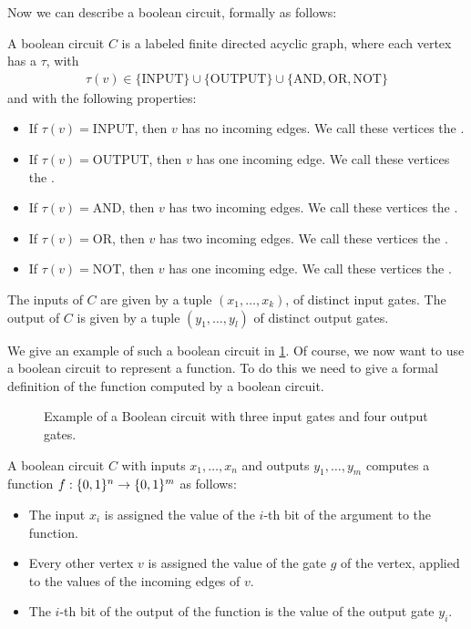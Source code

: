 Now we can describe a boolean circuit, formally as follows:
\begin{definition}
    A boolean circuit $C$ is a labeled finite directed acyclic graph, where each vertex has a  $\tau$, with
    \begin{align*}
        \tau(v) \in \{\text{INPUT}\} \cup \{\text{OUTPUT}\} \cup \{\text{AND}, \text{OR}, \text{NOT}\}
    \end{align*}
    and with the following properties:
    \begin{itemize}
        \item If $\tau(v) = \text{INPUT}$, then $v$ has no incoming edges. We call these vertices the .
        \item If $\tau(v) = \text{OUTPUT}$, then $v$ has one incoming edge. We call these vertices the .
        \item If $\tau(v) = \text{AND}$, then $v$ has two incoming edges. We call these vertices the .
        \item If $\tau(v) = \text{OR}$, then $v$ has two incoming edges. We call these vertices the .
        \item If $\tau(v) = \text{NOT}$, then $v$ has one incoming edge. We call these vertices the .
    \end{itemize}
    The inputs of $C$ are given by a tuple $(x_1, \dots, x_k)$, of distinct input gates. The output of $C$ is given by a tuple $(y_1, \dots, y_l)$ of distinct output gates.
\end{definition}

We give an example of such a boolean circuit in \cref{fig:boolean_circuit_example}. Of course, we now want to use a boolean circuit to represent a function. To do this we need to give a formal definition of the function computed by a boolean circuit.

\begin{figure}
    \centering
    \caption[Example of a Boolean Circuit]{Example of a Boolean circuit with three input gates and four output gates.}
    \label{fig:boolean_circuit_example}
\end{figure}

\begin{definition}
    A boolean circuit $C$ with inputs $x_1, \dots, x_n$ and outputs $y_1, \dots, y_m$ computes a function $f : \{0, 1\}^n \rightarrow \{0, 1\}^m$ as follows:
    \begin{itemize}
        \item The input $x_i$ is assigned the value of the $i$-th bit of the argument to the function.
        \item Every other vertex $v$ is assigned the value of the gate $g$ of the vertex, applied to the values of the incoming edges of $v$.
        \item The $i$-th bit of the output of the function is the value of the output gate $y_i$.
    \end{itemize}
\end{definition}

